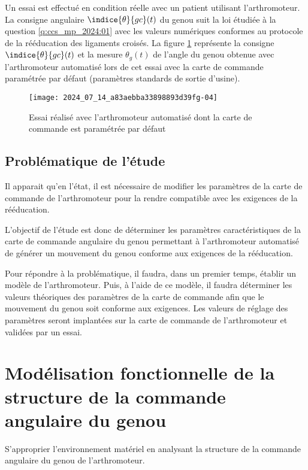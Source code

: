Un essai est effectué en condition réelle avec un patient utilisant l'arthromoteur. La consigne angulaire $\indice{\theta}{g c}(t)$ du genou suit la loi étudiée à la question \ref{q:ccs_mp_2024:01} avec les valeurs numériques conformes au protocole de la rééducation des ligaments croisés. La figure \ref{fig:ccs_mp_2024:fig:06} représente la consigne $\indice{\theta}{g c}(t)$ et la mesure $\theta_{g}(t)$ de l'angle du genou obtenue avec l'arthromoteur automatisé lors de cet essai avec la carte de commande paramétrée par défaut (paramètres standards de sortie d'usine).

\begin{figure}[!h]
\centering
\texttt{[image: 2024\_07\_14\_a83aebba33898893d39fg-04]}
\caption{\label{fig:ccs_mp_2024:fig:06}Essai réalisé avec l'arthromoteur automatisé dont la carte de commande est paramétrée par défaut}
\end{figure}



\subsection{Problématique de l'étude}
Il apparait qu'en l'état, il est nécessaire de modifier les paramètres de la carte de commande de l'arthromoteur pour la rendre compatible avec les exigences de la rééducation.

\begin{obj}
L'objectif de l'étude est donc de déterminer les paramètres caractéristiques de la carte de commande angulaire du genou permettant à l'arthromoteur automatisé de générer un mouvement du genou conforme aux exigences de la rééducation.
\end{obj}
Pour répondre à la problématique, il faudra, dans un premier temps, établir un modèle de l'arthromoteur. Puis, à l'aide de ce modèle, il faudra déterminer les valeurs théoriques des paramètres de la carte de commande afin que le mouvement du genou soit conforme aux exigences. Les valeurs de réglage des paramètres seront implantées sur la carte de commande de l'arthromoteur et validées par un essai.

\section{Modélisation fonctionnelle de la structure de la commande angulaire du genou}
\begin{obj}
S'approprier l'environnement matériel en analysant la structure de la commande angulaire du genou de l'arthromoteur.
\end{obj}

